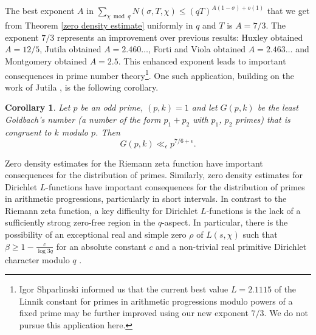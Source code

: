 \documentclass[12pt]{amsart}
\newtheorem{corollary}[theorem]{Corollary}
\theoremstyle{definition}
\theoremstyle{plain}
\theoremstyle{remark}
\numberwithin{equation}{section}
\numberwithin{theorem}{section}
\numberwithin{equation}{section}
\begin{document}
	The best exponent $A$ in $\sum_{\chi \bmod q} N(\sigma,T,\chi) \leq (qT)^{A(1-\sigma)+o(1)}$ that we get from Theorem \ref{zero density estimate} uniformly in $q$ and $T$ is $A=7/3$. The exponent $7/3$ represents an improvement over previous results: Huxley \cite{Huxley1975} obtained $A=12/5$, Jutila \cite{Jutila1972} obtained $A=2.460\dots$, Forti and Viola \cite{F-V1973} obtained $A=2.463\dots$ and Montgomery \cite[Thm. 12.1]{MontgomeryBook} obtained $A=2.5$. This enhanced exponent leads to important consequences in prime number theory\footnote{Igor Shparlinski informed us that the current best value
		$L=2.1115$ of the Linnik constant for primes in arithmetic progressions
		modulo powers of a fixed prime \cite{BS2019} may be further improved using our new exponent $7/3$. We do not pursue this application here.}. One such application, building on the work of Jutila \cite{Jutila1972}, is the following corollary.
	
	\begin{corollary}\label{lestGbn}
		Let $p$ be an odd prime, $(p, k)=1$ and let $G(p, k)$ be the least Goldbach's number (a number of the form $p_{1}+p_{2}$ with $p_{1}$, $p_{2}$ primes) that is congruent to $k$ modulo $p$. Then
		\[G(p, k) \ll_{\epsilon} p^{7/6+\epsilon}. \]
	\end{corollary}
	Zero density estimates for the Riemann zeta function have important consequences
	for the distribution of primes. Similarly, zero density estimates for Dirichlet $L$-functions have important consequences for the distribution of primes in arithmetic
	progressions, particularly in short intervals. In contrast to the Riemann zeta function, a key difficulty for Dirichlet $L$-functions is the lack of a sufficiently strong zero-free region in the $q$-aspect. In particular, there is the possibility of an exceptional real and simple zero $\rho$ of $L(s,\chi)$ such that $\beta \geq 1-\frac{c}{\log{3q}}$ for an absolute constant $c$ and a non-trivial real primitive Dirichlet character modulo $q$ \cite[Theorem 5.26]{iwanieckowalski}. 
	
\end{document}
